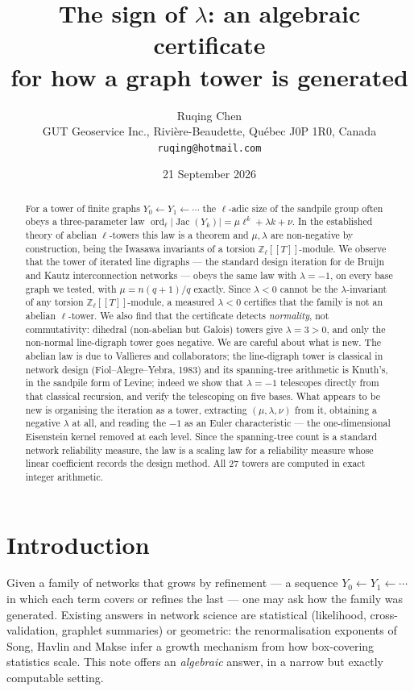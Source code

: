 \documentclass[11pt]{article}
\title{\bfseries The sign of $\lambda$: an algebraic certificate\\ for how a graph tower is generated}
\author{Ruqing Chen\\[2pt]
\normalsize GUT Geoservice Inc., Rivi\`ere-Beaudette, Qu\'ebec J0P 1R0, Canada\\
\normalsize\texttt{ruqing@hotmail.com}}
\date{21 September 2026}
\theoremstyle{plain}
\theoremstyle{remark}
\newcommand{\Z}{\mathbb{Z}}
\newcommand{\Zl}{\Z_\ell}
\newcommand{\Jac}{\operatorname{Jac}}
\newcommand{\ord}{\operatorname{ord}}
\begin{document}
\maketitle

\begin{abstract}
\noindent
For a tower of finite graphs $Y_0\leftarrow Y_1\leftarrow\cdots$ the $\ell$-adic size of
the sandpile group often obeys a three-parameter law
$\ord_\ell|\Jac(Y_k)|=\mu\ell^{k}+\lambda k+\nu$. In the established theory of abelian
$\ell$-towers this law is a theorem and $\mu,\lambda$ are non-negative by construction,
being the Iwasawa invariants of a torsion $\Zl[[T]]$-module. We observe that the tower of
iterated line digraphs --- the standard design iteration for de Bruijn and Kautz
interconnection networks --- obeys the same law with $\lambda=-1$, on every base graph we
tested, with $\mu=n(q{+}1)/q$ exactly. Since $\lambda<0$ cannot be the $\lambda$-invariant
of any torsion $\Zl[[T]]$-module, a measured $\lambda<0$ certifies that the family is not an
abelian $\ell$-tower. We also find that the certificate detects \emph{normality}, not
commutativity: dihedral (non-abelian but Galois) towers give $\lambda=3>0$, and only the
non-normal line-digraph tower goes negative. We are careful about what is new. The abelian
law is due to Vall\`ieres and collaborators; the line-digraph tower is classical in network
design (Fiol--Alegre--Yebra, 1983) and its spanning-tree arithmetic is Knuth's, in the
sandpile form of Levine; indeed we show that $\lambda=-1$ telescopes directly from that
classical recursion, and verify the telescoping on five bases. What appears to be new is
organising the iteration as a tower, extracting $(\mu,\lambda,\nu)$ from it, obtaining a
negative $\lambda$ at all, and reading the $-1$ as an Euler characteristic --- the
one-dimensional Eisenstein kernel removed at each level. Since the spanning-tree count is a
standard network reliability measure, the law is a scaling law for a reliability measure
whose linear coefficient records the design method. All $27$ towers are computed in exact
integer arithmetic.
\end{abstract}

\section{Introduction}\label{sec:intro}

Given a family of networks that grows by refinement --- a sequence
$Y_0\leftarrow Y_1\leftarrow\cdots$ in which each term covers or refines the last --- one
may ask how the family was generated. Existing answers in network science are statistical
(likelihood, cross-validation, graphlet summaries) or geometric: the renormalisation
exponents of Song, Havlin and Makse \cite{SHM05,SHM06} infer a growth mechanism from how
box-covering statistics scale. This note offers an \emph{algebraic} answer, in a narrow
but exactly computable setting.
\end{document}
